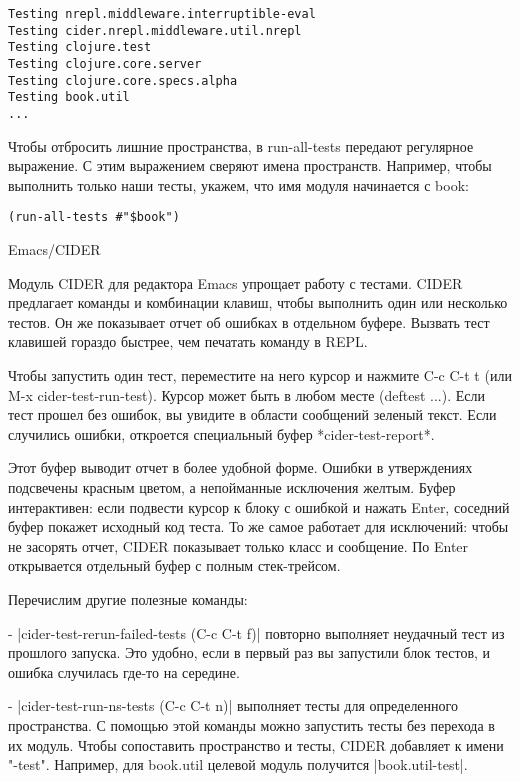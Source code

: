 \begin{verbatim}
Testing nrepl.middleware.interruptible-eval
Testing cider.nrepl.middleware.util.nrepl
Testing clojure.test
Testing clojure.core.server
Testing clojure.core.specs.alpha
Testing book.util
...
\end{verbatim}

Чтобы отбросить лишние пространства, в run-all-tests передают регулярное
выражение. С этим выражением сверяют имена пространств. Например, чтобы
выполнить только наши тесты, укажем, что имя модуля начинается с book:

\begin{verbatim}
(run-all-tests #"$book")
\end{verbatim}

Emacs/CIDER

Модуль CIDER для редактора Emacs упрощает работу с тестами. CIDER предлагает
команды и комбинации клавиш, чтобы выполнить один или несколько тестов. Он же
показывает отчет об ошибках в отдельном буфере. Вызвать тест клавишей гораздо
быстрее, чем печатать команду в REPL.

Чтобы запустить один тест, переместите на него курсор и нажмите C-c C-t t (или
M-x cider-test-run-test). Курсор может быть в любом месте (deftest ...). Если
тест прошел без ошибок, вы увидите в области сообщений зеленый текст. Если
случились ошибки, откроется специальный буфер *cider-test-report*.

Этот буфер выводит отчет в более удобной форме. Ошибки в утверждениях подсвечены
красным цветом, а непойманные исключения желтым. Буфер интерактивен: если
подвести курсор к блоку с ошибкой и нажать Enter, соседний буфер покажет
исходный код теста. То же самое работает для исключений: чтобы не засорять
отчет, CIDER показывает только класс и сообщение. По Enter открывается отдельный
буфер с полным стек-трейсом.

Перечислим другие полезные команды:

- \spverb|cider-test-rerun-failed-tests (C-c C-t f)| повторно выполняет неудачный тест
  из прошлого запуска. Это удобно, если в первый раз вы запустили блок тестов, и
  ошибка случилась где-то на середине.

- \spverb|cider-test-run-ns-tests (C-c C-t n)| выполняет тесты для определенного
  пространства. С помощью этой команды можно запустить тесты без перехода в их
  модуль. Чтобы сопоставить пространство и тесты, CIDER добавляет к имени
  "-test". Например, для book.util целевой модуль получится \spverb|book.util-test|.

